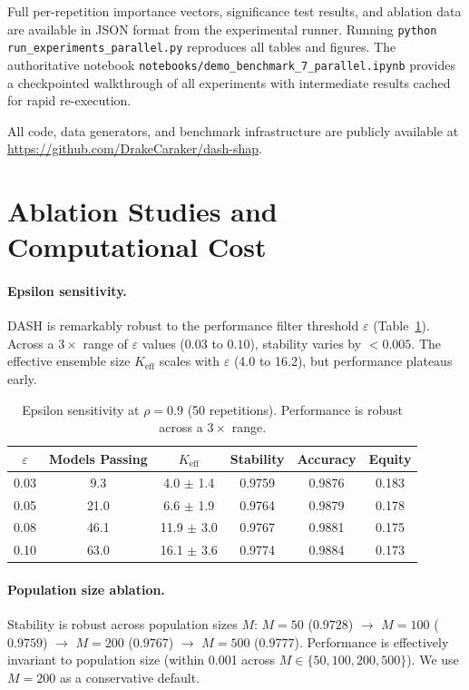 \documentclass[11pt]{article}
\newcommand{\dash}{\textsc{DASH}}
\newcommand{\rhovar}{\rho}
\begin{document}
Full per-repetition importance vectors, significance test results, and
ablation data are available in JSON format from the experimental runner.
Running \texttt{python run\_experiments\_parallel.py} reproduces all tables and
figures. The authoritative notebook
\texttt{notebooks/demo\_benchmark\_7\_parallel.ipynb} provides a checkpointed
walkthrough of all experiments with intermediate results cached for
rapid re-execution.

All code, data generators, and benchmark infrastructure are publicly
available at \url{https://github.com/DrakeCaraker/dash-shap}.

\section{Ablation Studies and Computational Cost}
\label{app:ablation}

\paragraph{Epsilon sensitivity.}
\dash{} is remarkably robust to the performance filter threshold
$\varepsilon$ (Table~\ref{tab:epsilon}). Across a $3\times$ range of
$\varepsilon$ values ($0.03$ to $0.10$), stability varies by $< 0.005$.
The effective ensemble size $K_{\text{eff}}$ scales with $\varepsilon$
(4.0 to 16.2), but performance plateaus early.

\begin{table}[htbp]
\centering
\caption{Epsilon sensitivity at $\rhovar = 0.9$ (50 repetitions).
Performance is robust across a $3\times$ range.}
\label{tab:epsilon}
\begin{tabular}{cccccc}
\toprule
$\varepsilon$ & Models Passing & $K_{\text{eff}}$ & Stability & Accuracy & Equity \\
\midrule
0.03 & 9.3  & 4.0 $\pm$ 1.4  & 0.9759 & 0.9876 & 0.183 \\
0.05 & 21.0  & 6.6 $\pm$ 1.9 & 0.9764 & 0.9879 & 0.178 \\
0.08 & 46.1 & 11.9 $\pm$ 3.0 & 0.9767 & 0.9881 & 0.175 \\
0.10 & 63.0 & 16.1 $\pm$ 3.6 & 0.9774 & 0.9884 & 0.173 \\
\bottomrule
\end{tabular}
\end{table}

\paragraph{Population size ablation.}
Stability is robust across population sizes $M$:
$M = 50$ ($0.9728$) $\to$ $M = 100$ ($0.9759$)
$\to$ $M = 200$ ($0.9767$) $\to$ $M = 500$ ($0.9777$). Performance
is effectively invariant to population size (within 0.001 across
$M \in \{50, 100, 200, 500\}$). We use $M = 200$ as a conservative default.
\end{document}
